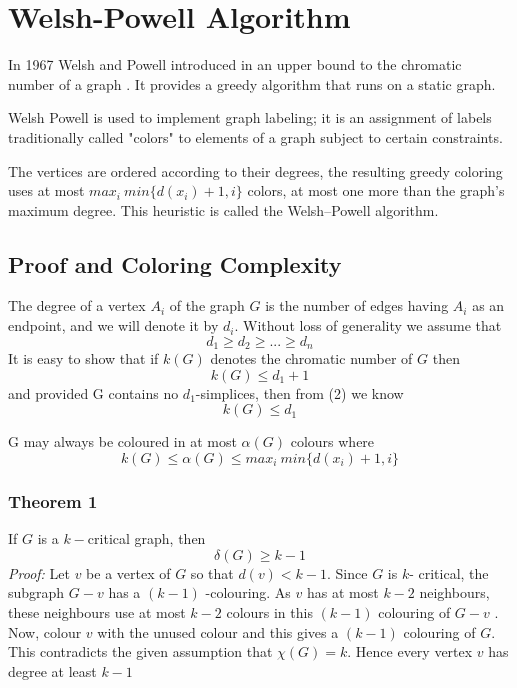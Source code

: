\documentclass[a4paper,12pt]{article}
\begin{document}
\section{Welsh-Powell Algorithm}
In 1967 Welsh and Powell introduced in an upper bound to the chromatic number of a graph . It provides a greedy algorithm that runs on a static graph.

Welsh Powell is used to implement graph labeling; it is an assignment of labels traditionally called "colors" to elements of a graph subject to certain constraints.

The vertices are ordered according to their degrees, the resulting greedy coloring uses at most $max_i\ min\{d(x_i)+1,i\}$ colors, at most one more than the graph’s maximum degree. This heuristic is called the Welsh–Powell algorithm.
\subsection{Proof and Coloring Complexity}
The degree of a vertex $A_i$ of the graph $G$ is the number of edges having $A_i$ as an endpoint, and we will denote  it by $d_i$. Without loss of generality we assume that 
\begin{equation}
d_1 \geq d_2 \geq ...\geq d_n
\end{equation}
It is easy to show that if $k(G)$ denotes the chromatic number of $G$ then 
\begin{equation}
k(G) \leq d_1 + 1
\end{equation}
and provided G contains no $d_1$-simplices, then from (2) we know 
\begin{equation}
k(G) \leq d_1
\end{equation}

G may  always be coloured in at most $\alpha(G)$ colours where 
\begin{equation}
k(G) \leq \alpha(G) \leq max_i\ min\{d(x_i)+1,i\}
\end{equation}
\subsubsection{Theorem 1}
If $G$ is a $k-$critical graph, then
\begin{equation*}
\delta(G) \geq k-1
\end{equation*}
\textit{Proof:}
Let $ v $ be a vertex of $ G $ so that $d(v)<k-1$. Since $G$ is $k$- critical, the subgraph $G-v$
has a $(k-1)$ -colouring. As $ v $ has at most $k-2$ neighbours, these neighbours use at
most $k-2$ colours in this $(k-1)$ colouring of $G-v$ . Now, colour $ v $ with the unused
colour and this gives a $(k-1)$ colouring of $ G $. This contradicts the given assumption
that $\chi(G) = k$. Hence every vertex $ v $ has degree at least $k-1$
\end{document}
